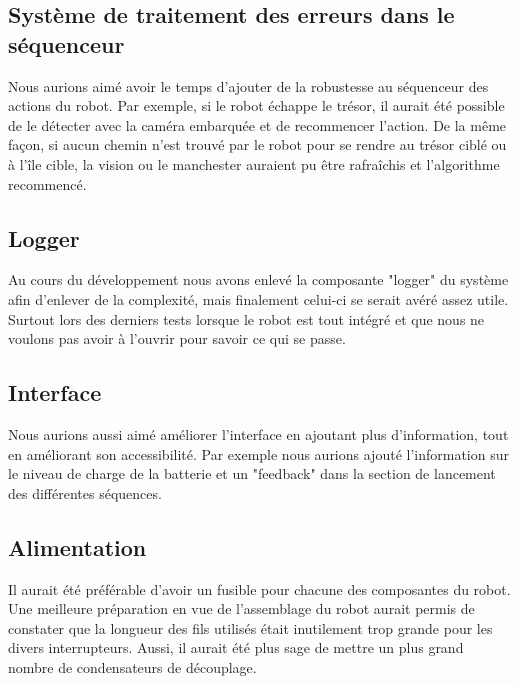 \subsection{Système de traitement des erreurs dans le séquenceur}
Nous aurions aimé avoir le temps d’ajouter de la robustesse au séquenceur des actions du robot. Par exemple, si le robot échappe le trésor, il aurait été possible de le détecter avec la caméra embarquée et de recommencer l’action. De la même façon, si aucun chemin n’est trouvé par le robot pour se rendre au trésor ciblé ou à l’île cible, la vision ou le manchester auraient pu être rafraîchis et l’algorithme recommencé. 

\subsection{Logger}
Au cours du développement nous avons enlevé la composante "logger" du système afin d'enlever de la complexité, mais finalement celui-ci se serait avéré assez utile. Surtout lors des derniers tests lorsque le robot est tout intégré et que nous ne voulons pas avoir à l'ouvrir pour savoir ce qui se passe.

\subsection{Interface}
Nous aurions aussi aimé améliorer l'interface en ajoutant plus d'information, tout en améliorant son accessibilité. Par exemple nous aurions ajouté l'information sur le niveau de charge de la batterie et un "feedback" dans la section de lancement des différentes séquences.

\subsection{Alimentation}
Il aurait été préférable d’avoir un fusible pour chacune des composantes du robot. Une meilleure préparation en vue de l’assemblage du robot aurait permis de constater que la longueur des fils utilisés était inutilement trop grande pour les divers interrupteurs. Aussi, il aurait été plus sage de mettre un plus grand nombre de condensateurs de découplage. 
